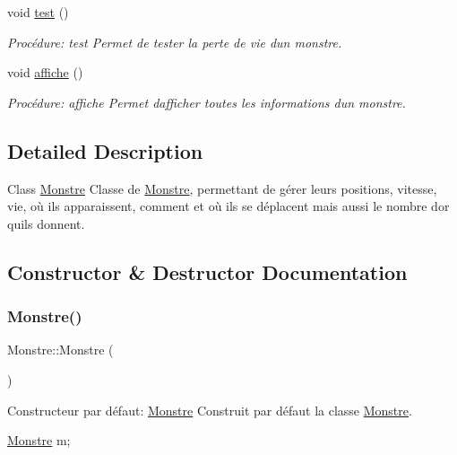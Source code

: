 \begin{DoxyCompactItemize}
void \hyperlink{classMonstre_a4f22d17531f5ca164355740d035485ee}{test} ()
\begin{DoxyCompactList}\small\item\em Procédure\+: test Permet de tester la perte de vie d\textquotesingle{}un monstre. \end{DoxyCompactList}\item 
void \hyperlink{classMonstre_ac6700482d005ec983746983f76ad0088}{affiche} ()
\begin{DoxyCompactList}\small\item\em Procédure\+: affiche Permet d\textquotesingle{}afficher toutes les informations d\textquotesingle{}un monstre. \end{DoxyCompactList}\end{DoxyCompactItemize}


\subsection{Detailed Description}
Class \hyperlink{classMonstre}{Monstre} Classe de \hyperlink{classMonstre}{Monstre}, permettant de gérer leurs positions, vitesse, vie, où ils apparaissent, comment et où ils se déplacent mais aussi le nombre d\textquotesingle{}or qu\textquotesingle{}ils donnent. 

\subsection{Constructor \& Destructor Documentation}
\mbox{\label{classMonstre_a8efe47ee8ea4b5ee8e5d3820e620059b}} 
\subsubsection{\texorpdfstring{Monstre()}{Monstre()}\hspace{0.1cm}{\footnotesize\ttfamily [1/3]}}
{\footnotesize\ttfamily Monstre\+::\+Monstre (\begin{DoxyParamCaption}{ }\end{DoxyParamCaption})}



Constructeur par défaut\+: \hyperlink{classMonstre}{Monstre} Construit par défaut la classe \hyperlink{classMonstre}{Monstre}. 


\begin{DoxyCode}
\hyperlink{classMonstre}{Monstre} m;
\end{DoxyCode}
 \mbox{\label{classMonstre_a9097846a3f136f6db0a51b80a3ccc15d}} 

